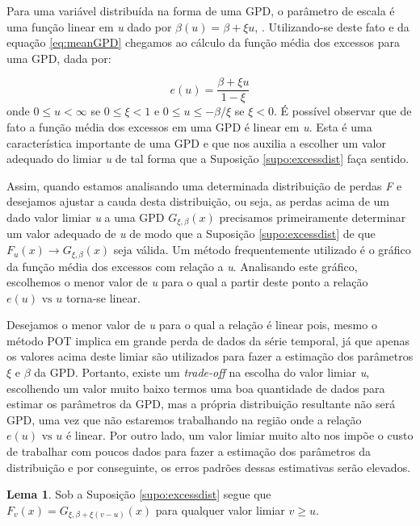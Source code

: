 \documentclass[review]{elsarticle}
\theoremstyle{definition}
\newtheorem{lema}[teor]{Lema}
\begin{document}
Para uma variável distribuída na forma de uma GPD, o parâmetro de escala é uma função linear em \emph{u} dado por $\beta(u)=\beta + \xi u$, \cite[Teorema 3.4.13(e)]{Embrechts1997}. Utilizando-se deste fato e da equação \eqref{eq:meanGPD} chegamos ao cálculo da função média dos excessos para uma GPD, dada por:

\begin{equation}
\label{eq:eu}
e(u)=\frac{\beta+\xi u}{1-\xi}
\end{equation}
onde $0 \leq u < \infty$ se $0 \leq \xi <1$ e $0 \leq u \leq -\beta / \xi$ se $\xi < 0$. É possível observar que de fato a função média dos excessos em uma GPD é linear em \emph{u}. Esta é uma característica importante de uma GPD e que nos auxilia a escolher um valor adequado do limiar \emph{u} de tal forma que a Suposição \ref{supo:excessdist} faça sentido.

Assim, quando estamos analisando uma determinada distribuição de perdas \emph{F} e desejamos ajustar a cauda desta distribuição, ou seja, as perdas acima de um dado valor limiar \emph{u} a uma GPD $G_{\xi, \beta}(x)$ precisamos primeiramente determinar um valor adequado de \emph{u} de modo que a Suposição \ref{supo:excessdist} de que $F_u(x)\rightarrow G_{\xi, \beta}(x)$ seja válida. Um método frequentemente utilizado é o gráfico da função média dos excessos com relação a \emph{u}. Analisando este gráfico, escolhemos o menor valor de \emph{u} para o qual a partir deste ponto a relação $e(u) \text{ vs } u$ torna-se linear.

Desejamos o menor valor de \emph{u} para o qual a relação é linear pois, mesmo o método POT implica em grande perda de dados da série temporal, já que apenas os valores acima deste limiar são utilizados para fazer a estimação dos parâmetros $\xi$ e $\beta$ da GPD. Portanto, existe um \emph{trade-off} na escolha do valor limiar \emph{u}, escolhendo um valor muito baixo termos uma boa quantidade de dados para estimar os parâmetros da GPD, mas a própria distribuição resultante não será GPD, uma vez que não estaremos trabalhando na região onde a relação $e(u) \text{ vs } u$ é linear. Por outro lado, um valor limiar muito alto nos impõe o custo de trabalhar com poucos dados para fazer a estimação dos parâmetros da distribuição e por conseguinte, os erros padrões dessas estimativas serão elevados.

\begin{lema} \label{lema:ev}
	Sob a Suposição \ref{supo:excessdist} segue que $F_v (x)=G_{\xi,\beta+\xi(v-u)} (x)$ para qualquer valor limiar $v \geq u$.
\end{lema}
\end{document}
